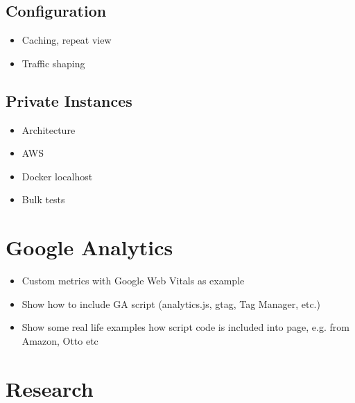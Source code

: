 \subsection{Configuration}

\begin{itemize}
\item Caching, repeat view
\item Traffic shaping
\end{itemize}


\subsection{Private Instances}

\begin{itemize}
\item Architecture
\item AWS
\item Docker localhost
\item Bulk tests
\end{itemize}






\section{Google Analytics}

\begin{itemize}
    \item Custom metrics with Google Web Vitals as example
    \item Show how to include GA script (analytics.js, gtag, Tag Manager, etc.)
    \item Show some real life examples how script code is included into page, e.g. from Amazon, Otto etc
\end{itemize}




\section{Research}







